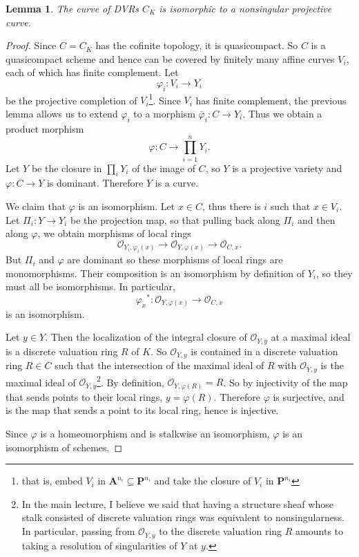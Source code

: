\documentclass[reqno,12pt,letterpaper]{amsart}
\newcommand{\PP}{\mathbf P}
\newcommand{\Aff}{\mathbf A}
\newcommand{\Olo}{\mathscr O}
\newtheorem{lemma}[theorem]{Lemma}
\theoremstyle{definition}
\begin{document}
\begin{lemma}
The curve of DVRs $C_K$ is isomorphic to a nonsingular projective curve.
\end{lemma}
\begin{proof}
Since $C = C_K$ has the cofinite topology, it is quasicompact.
So $C$ is a quasicompact scheme and hence can be covered by finitely many affine curves $V_i$, each of which has finite complement.
Let
$$\varphi_i: V_i \to Y_i$$
be the projective completion of $V_i$\footnote{that is, embed $V_i$ in $\Aff^{n_i} \subseteq \PP^{n_i}$ and take the closure of $V_i$ in $\PP^{n_i}$}.
Since $V_i$ has finite complement, the previous lemma allows us to extend $\varphi_i$ to a morphism $\overline \varphi_i: C \to Y_i$.
Thus we obtain a product morphism
$$\varphi: C \to \prod_{i=1}^n Y_i.$$
Let $Y$ be the closure in $\prod_i Y_i$ of the image of $C$, so $Y$ is a projective variety and $\varphi: C \to Y$ is dominant.
Therefore $Y$ is a curve.

We claim that $\varphi$ is an isomorphism.
Let $x \in C$, thus there is $i$ such that $x \in V_i$. Let $\Pi_i: Y \to Y_i$ be the projection map, so that pulling back along $\Pi_i$ and then along $\varphi$, we obtain morphisms of local rings
$$\Olo_{Y_i, \varphi_i(x)} \to \Olo_{Y, \varphi(x)} \to \Olo_{C, x}.$$
But $\Pi_i$ and $\varphi$ are dominant so these morphisms of local rings are monomorphisms.
Their composition is an isomorphism by definition of $Y_i$, so they must all be isomorphisms.
In particular,
$${\varphi_x}^* : \Olo_{Y, \varphi(x)} \to \Olo_{C, x}$$
is an isomorphism.

Let $y \in Y$. Then the localization of the integral closure of $\Olo_{Y, y}$ at a maximal ideal is a discrete valuation ring $R$ of $K$.
So $\Olo_{Y, y}$ is contained in a discrete valuation ring $R \in C$ such that the intersection of the maximal ideal of $R$ with $\Olo_{Y, y}$ is the maximal ideal of $\Olo_{Y, y}$\footnote{In the main lecture,
I believe we said that having a structure sheaf whose stalk consisted of discrete valuation rings was equivalent to nonsingularness.
In particular, passing from $\Olo_{Y, y}$ to the discrete valuation ring $R$ amounts to taking a resolution of singularities of $Y$ at $y$.}.
By definition, $\Olo_{Y, \varphi(R)} = R$. So by injectivity of the map that sends points to their local rings, $y = \varphi(R)$.
Therefore $\varphi$ is surjective, and is the map that sends a point to its local ring, hence is injective.

Since $\varphi$ is a homeomorphism and is stalkwise an isomorphism, $\varphi$ is an isomorphism of schemes.
\end{proof}
\end{document}
